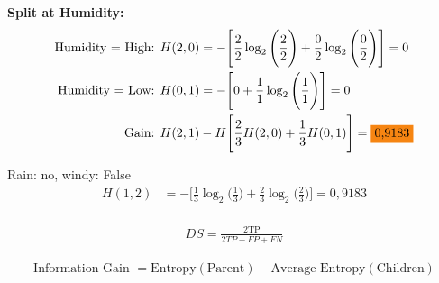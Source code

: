 \documentclass{article}
\begin{document}
\textbf{Split at Humidity:}
\begin{align*}
    \text{Humidity = High: } &H(2,0) = -\Bigg[\frac{2}{2} \log_2\Bigg(\frac{2}{2}\Bigg) + \frac{0}{2} \log_2\Bigg(\frac{0}{2}\Bigg)\Bigg] = 0\\
    \text{Humidity = Low: } &H(0,1) = -\Bigg[0 + \frac{1}{1} \log_2\Bigg(\frac{1}{1}\Bigg)\Bigg] = 0\\
    \text{Gain: } &H(2,1) - H\Bigg[\frac{2}{3} H(2,0) + \frac{1}{3} H(0,1)\Bigg] = \text{\colorbox{BurntOrange}{0,9183}}
\end{align*}

Rain: no, windy: False
\begin{align*}
    H(1,2) &= -\Bigg[\frac{1}{3} \log_2\Bigg(\frac{1}{3}\Bigg) + \frac{2}{3} \log_2\Bigg(\frac{2}{3}\Bigg)\Bigg] = 0,9183\\
\end{align*}

\begin{align*}
    DS = \frac{2\text{TP}}{2TP + FP + FN}
\end{align*}

\begin{align*}
    \text{Information Gain } = \text{Entropy}(\text{Parent}) - \text{Average Entropy}(\text{Children})
\end{align*}
\end{document}

